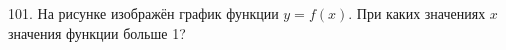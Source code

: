 101. На рисунке изображён график функции $y=f(x).$ При каких значениях $x$ значения функции больше 1?
\begin{figure}[ht!]
\end{figure}\\
